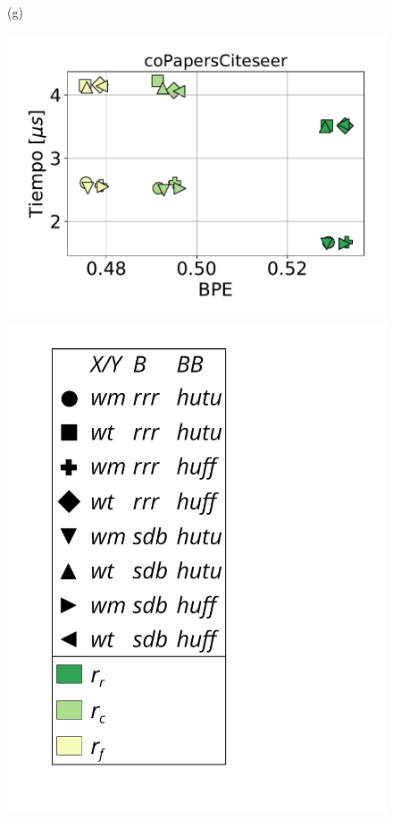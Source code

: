 \begin{figure}
\begin{minipage}{1\textwidth}
\begin{minipage}{0.45\textwidth}
    			(g)
    		\end{minipage}
    		\begin{minipage}{0.45\textwidth}
    			\centering
    			\begin{minipage}{0.75\textwidth}
    				\centering
    				\includegraphics[width=1\linewidth]{img/sdsl/aleatorio/coPapersCiteseer.pdf}
    			\end{minipage}
    			\begin{minipage}{0.2\textwidth}
    				\centering
    				\includegraphics[scale=.16, clip, trim=70 0 0 0]{img/sdsl/label.pdf}

\end{minipage}
\end{minipage}
\end{minipage}
\end{figure}
